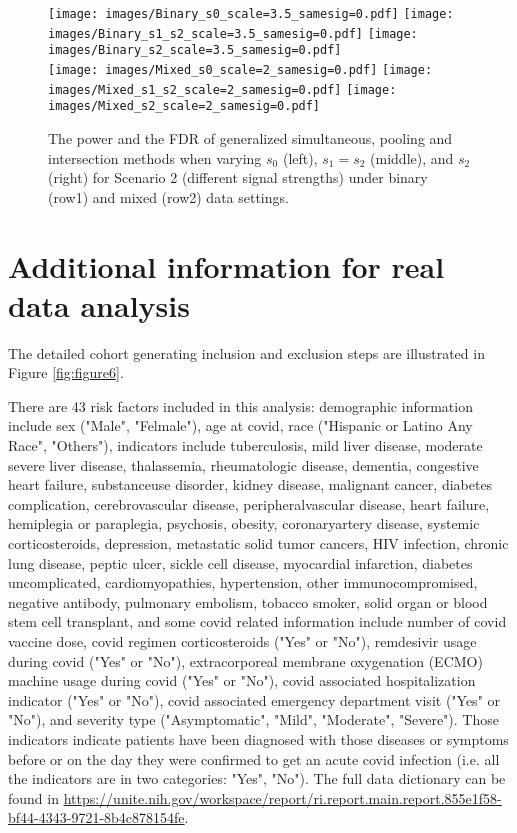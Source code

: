\documentclass[11pt]{article}
\theoremstyle{plain}
\theoremstyle{definition}
\theoremstyle{remark}
\newcommand{\0}{\mathbf{0}}
\begin{document}
\begin{figure}[h!]
    \centering
    \texttt{[image: images/Binary\_s0\_scale=3.5\_samesig=0.pdf]}
    \texttt{[image: images/Binary\_s1\_s2\_scale=3.5\_samesig=0.pdf]}
    \texttt{[image: images/Binary\_s2\_scale=3.5\_samesig=0.pdf]}\\
    \texttt{[image: images/Mixed\_s0\_scale=2\_samesig=0.pdf]}
    \texttt{[image: images/Mixed\_s1\_s2\_scale=2\_samesig=0.pdf]}
    \texttt{[image: images/Mixed\_s2\_scale=2\_samesig=0.pdf]}
    \caption{The power and the FDR of generalized simultaneous, pooling and intersection methods when varying $s_0$ (left), $s_1=s_2$ (middle), and $s_2$ (right) for Scenario 2 (different signal strengths) under binary (row1) and mixed (row2) data settings.}
    \label{fig:figure5}
\end{figure}

\section{Additional information for real data analysis} \label{app:real}
The detailed cohort generating inclusion and exclusion steps are illustrated in Figure \ref{fig:figure6}.

There are 43 risk factors included in this analysis: demographic information include sex ("Male", "Felmale"), age at covid, race ("Hispanic or Latino Any Race", "Others"), indicators include tuberculosis, mild liver disease, moderate severe liver disease, thalassemia, rheumatologic disease, dementia, congestive heart failure, substanceuse disorder, kidney disease, malignant cancer, diabetes complication, cerebrovascular disease, peripheralvascular disease, heart failure, hemiplegia or paraplegia, psychosis, obesity, coronaryartery disease, systemic corticosteroids, depression, metastatic solid tumor cancers, HIV infection, chronic lung disease, peptic ulcer, sickle cell disease, myocardial infarction, diabetes uncomplicated, cardiomyopathies, hypertension, other immunocompromised, negative antibody, pulmonary embolism, tobacco smoker, solid organ or blood stem cell transplant, and some covid related information include number of covid vaccine dose, covid regimen corticosteroids ("Yes" or "No"), remdesivir usage during covid ("Yes" or "No"), extracorporeal membrane oxygenation (ECMO) machine usage during covid ("Yes" or "No"), covid associated hospitalization indicator ("Yes" or "No"), covid associated emergency department visit ("Yes" or "No"), and severity type ("Asymptomatic", "Mild", "Moderate", "Severe"). Those indicators indicate patients have been diagnosed with those diseases or symptoms before or on the day they were confirmed to get an acute covid infection (i.e. all the indicators are in two categories: "Yes", "No"). The full data dictionary can be found in \url{https://unite.nih.gov/workspace/report/ri.report.main.report.855e1f58-bf44-4343-9721-8b4c878154fe}.
\end{document}

